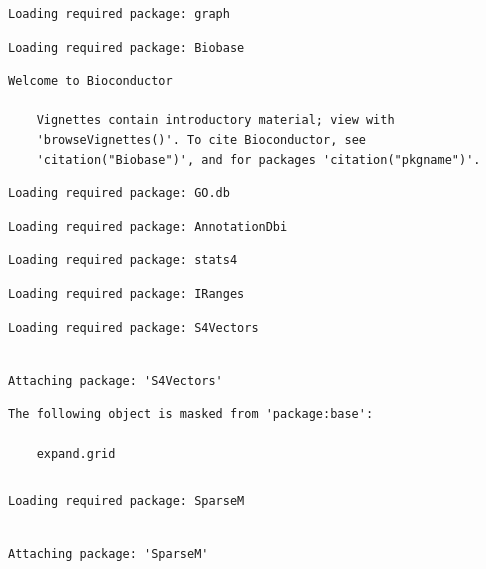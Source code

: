\documentclass[]{article}
\begin{document}
\begin{verbatim}
Loading required package: graph
\end{verbatim}

\begin{verbatim}
Loading required package: Biobase
\end{verbatim}

\begin{verbatim}
Welcome to Bioconductor

    Vignettes contain introductory material; view with
    'browseVignettes()'. To cite Bioconductor, see
    'citation("Biobase")', and for packages 'citation("pkgname")'.
\end{verbatim}

\begin{verbatim}
Loading required package: GO.db
\end{verbatim}

\begin{verbatim}
Loading required package: AnnotationDbi
\end{verbatim}

\begin{verbatim}
Loading required package: stats4
\end{verbatim}

\begin{verbatim}
Loading required package: IRanges
\end{verbatim}

\begin{verbatim}
Loading required package: S4Vectors
\end{verbatim}

\begin{verbatim}

Attaching package: 'S4Vectors'
\end{verbatim}

\begin{verbatim}
The following object is masked from 'package:base':

    expand.grid
\end{verbatim}

\begin{verbatim}
\end{verbatim}

\begin{verbatim}
Loading required package: SparseM
\end{verbatim}

\begin{verbatim}

Attaching package: 'SparseM'
\end{verbatim}
\end{document}
